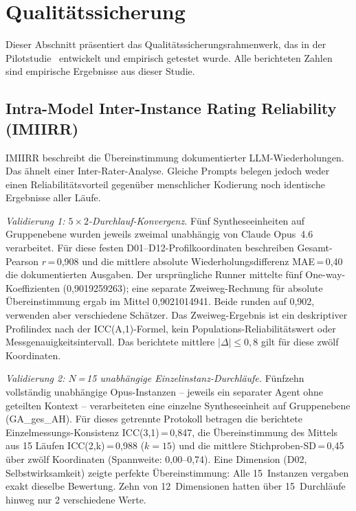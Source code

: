 \documentclass[11pt,a4paper]{article}
\begin{document}
\section{Qualitätssicherung}
\label{sec:qa}

Dieser Abschnitt präsentiert das Qualitätssicherungsrahmenwerk, das in der Pilotstudie~\citep{Geiger2026PaperA} entwickelt und empirisch getestet wurde. Alle berichteten Zahlen sind empirische Ergebnisse aus dieser Studie.


\subsection{Intra-Model Inter-Instance Rating Reliability (IMIIRR)}
\label{sec:qa:imiirr}

IMIIRR beschreibt die Übereinstimmung dokumentierter LLM-Wiederholungen. Das ähnelt einer Inter-Rater-Analyse. Gleiche Prompts belegen jedoch weder einen Reliabilitätsvorteil gegenüber menschlicher Kodierung noch identische Ergebnisse aller Läufe.

\emph{Validierung 1: $5 \times 2$-Durchlauf-Konvergenz.} Fünf Syntheseeinheiten auf Gruppenebene wurden jeweils zweimal unabhängig von Claude Opus~4.6 verarbeitet. Für diese festen D01--D12-Profilkoordinaten beschreiben Gesamt-Pearson $r$\,=\,0,908 und die mittlere absolute Wiederholungsdifferenz MAE\,=\,0,40 die dokumentierten Ausgaben. Der ursprüngliche Runner mittelte fünf One-way-Koeffizienten (0,9019259263); eine separate Zweiweg-Rechnung für absolute Übereinstimmung ergab im Mittel 0,9021014941. Beide runden auf 0,902, verwenden aber verschiedene Schätzer. Das Zweiweg-Ergebnis ist ein deskriptiver Profilindex nach der ICC(A,1)-Formel, kein Populations-Reliabilitätswert oder Messgenauigkeitsintervall. Das berichtete mittlere $|\Delta| \leq 0,8$ gilt für diese zwölf Koordinaten.

\emph{Validierung 2: $N$\,=\,15 unabhängige Einzelinstanz-Durchläufe.} Fünfzehn vollständig unabhängige Opus-Instanzen -- jeweils ein separater Agent ohne geteilten Kontext -- verarbeiteten eine einzelne Syntheseeinheit auf Gruppenebene (GA\_ges\_AH). Für dieses getrennte Protokoll betragen die berichtete Einzelmessungs-Konsistenz ICC(3,1)\,=\,0,847, die Übereinstimmung des Mittels aus 15 Läufen ICC(2,k)\,=\,0,988 ($k=15$) und die mittlere Stichproben-SD\,=\,0,45 über zwölf Koordinaten (Spannweite: 0,00--0,74). Eine Dimension (D02, Selbstwirksamkeit) zeigte perfekte Übereinstimmung: Alle 15~Instanzen vergaben exakt dieselbe Bewertung. Zehn von 12~Dimensionen hatten über 15~Durchläufe hinweg nur 2 verschiedene Werte.
\end{document}
